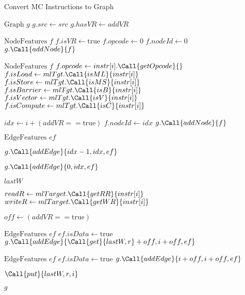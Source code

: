 \begin{algorithm}
\caption{Convert MC Instructions to Graph}
\begin{algorithmic}[1]
\small
\linespread{0.8}\selectfont
{}
    \State $\text{Graph } g$
    \State $g.src \gets src$
    \State $g.hasVR \gets addVR$
    
        \State $\text{NodeFeatures } f$
        \State $f.isVR \gets \text{true}$
        \State $f.opcode \gets 0$
        \State $f.nodeId \gets 0$
        \State $g.\Call{addNode}{f}$
    \EndIf
    
        \State $\text{NodeFeatures } f$
        \State $f.opcode \gets instr[i].\Call{getOpcode}{}$
        \State $f.isLoad \gets mlTgt.\Call{isML}{instr[i]}$
        \State $f.isStore \gets mlTgt.\Call{isMS}{instr[i]}$
        \State $f.isBarrier \gets mlTgt.\Call{isB}{instr[i]}$
        \State $f.isVector \gets mlTgt.\Call{isV}{instr[i]}$
        \State $f.isCompute \gets mlTgt.\Call{isC}{instr[i]}$
        
        \State $idx \gets i + (addVR == \text{true})$
        \State $f.nodeId \gets idx$
        \State $g.\Call{addNode}{f}$
        
        \State $\text{EdgeFeatures } ef$
        
            \State $g.\Call{addEdge}{idx-1, idx, ef}$
        \EndIf
        
            \State $g.\Call{addEdge}{0, idx, ef}$
        \EndIf
    \EndFor
    
    \State $lastW$
    
        \State $readR \gets mlTarget.\Call{getRR}{instr[i]}$
        \State $writeR \gets mlTarget.\Call{getWR}{instr[i]}$
        
            \State $off \gets (addVR == \text{true})$
            
                \State $\text{EdgeFeatures } ef$
                \State $ef.isData \gets \text{true}$
                \State $g.\Call{addEdge}{\Call{get}{lastW, r} + off, i + off, ef}$
            \EndIf
            
                \State $\text{EdgeFeatures } ef$
                \State $ef.isData \gets \text{true}$
                \State $g.\Call{addEdge}{i + off, i + off, ef}$
            \EndIf
        \EndFor
        
            \State $\Call{put}{lastW, r, i}$
        \EndFor
    \EndFor
    
    \State \Return $g$
\EndFunction
\end{algorithmic}
\end{algorithm}

